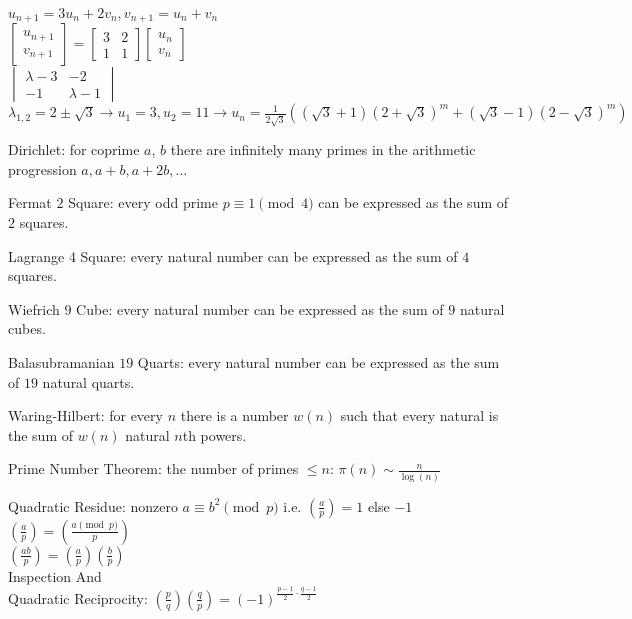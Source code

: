 $u_{n+1}=3u_n+2v_n,v_{n+1}=u_n+v_n$ \\
$\begin{bmatrix} u_{n+1} \\ v_{n+1} \end{bmatrix} = \begin{bmatrix} 3 & 2 \\ 1 & 1 \end{bmatrix} \begin{bmatrix} u_n \\ v_n \end{bmatrix}$ \\
$\begin{vmatrix} \lambda-3 & -2 \\ -1 & \lambda-1 \end{vmatrix}$ \\
$\lambda_{1,2}=2 \pm \sqrt{3} \to u_1=3, u_2=11 \to u_n = \frac{1}{2 \sqrt{3}} ((\sqrt{3}+1)(2+\sqrt{3})^m+(\sqrt{3}-1)(2-\sqrt{3})^m)$

Dirichlet: for coprime $a$, $b$ there are infinitely many primes in the arithmetic progression $a,a+b,a+2b,\dots$

Fermat $2$ Square: every odd prime $p \equiv 1 \pmod{4}$ can be expressed as the sum of $2$ squares.

Lagrange $4$ Square: every natural number can be expressed as the sum of $4$ squares.

Wiefrich $9$ Cube: every natural number can be expressed as the sum of $9$ natural cubes.

Balasubramanian $19$ Quarts: every natural number can be expressed as the sum of $19$ natural quarts.

Waring-Hilbert: for every $n$ there is a number $w(n)$ such that every natural is the sum of $w(n)$ natural $n$th powers.

Prime Number Theorem: the number of primes $\le n$: $\pi (n) \sim \frac{n}{\log(n)}$

Quadratic Residue: nonzero $a \equiv b^2 \pmod{p}$ i.e. $\left(\frac{a}{p} \right) = 1$ else $-1$ \\
$\left(\frac{a}{p} \right) = \left(\frac{a \pmod{p}}{p} \right)$ \\
$\left(\frac{ab}{p} \right) = \left(\frac{a}{p} \right) \left(\frac{b}{p} \right)$ \\
Inspection And \\
Quadratic Reciprocity: $\left(\frac{p}{q} \right) \left(\frac{q}{p} \right) = (-1)^{\frac{p-1}{2} \cdot \frac{q-1}{2}}$

